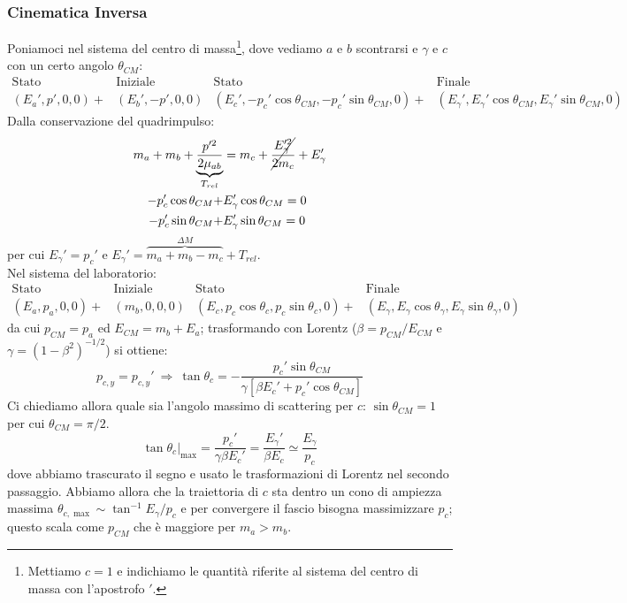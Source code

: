 \subsubsection{Cinematica Inversa} 
Poniamoci nel sistema del centro di massa\footnote{Mettiamo $c=1$ e indichiamo le quantità riferite al sistema del centro di massa con l'apostrofo $'$.}, dove vediamo $a$ e $b$ scontrarsi e $\gamma$ e $c$  con un certo angolo $\theta_{CM}$:
\begin{align*}
	\text{Stato  }&\text{Iniziale} & \text{Stato  }&\text{Finale} \\
	(E_a',p',0,0) +&(E_b',-p',0,0) & (E_c',-p_c'\cos{\theta_{CM}},-p_c'\sin{\theta_{CM},0}) +&(E_\gamma',E_\gamma'\cos{\theta_{CM}},E_\gamma'\sin{\theta_{CM}},0) 
\end{align*}
Dalla conservazione del quadrimpulso:
\begin{align*}
	m_a+m_b + \underbrace{\frac{p'^{2}}{2\mu_{ab}}}_{T_{rel}} &= m_c + \cancel{\frac{E_\gamma'^2}{2m_c}}+E_\gamma' \\ 
	-p_c'\cos{\theta_{CM}} +& E_\gamma' \cos{\theta_{CM}} = 0\\
	-p_c'\sin{\theta_{CM}} +& E_\gamma' \sin{\theta_{CM}} = 0
\end{align*}
per cui $E_\gamma' = p_c'$ e $E_\gamma' = \overbrace{m_a+m_b-m_c}^{\Delta M} + T_{rel}$.\\ 
Nel sistema del laboratorio:
\begin{align*}
	\text{Stato  }&\text{Iniziale} & \text{Stato  }&\text{Finale} \\
	(E_a,p_a,0,0) +&(m_b,0,0,0) & (E_c,p_c\cos{\theta_{c}},p_c\sin{\theta_{c},0}) +&(E_\gamma,E_\gamma\cos{\theta_{\gamma}},E_\gamma\sin{\theta_{\gamma}},0) 
\end{align*}
da cui $p_{CM} =p_a$ ed $E_{CM} = m_b + E_a$; trasformando con Lorentz ($\beta = p_{CM}/E_{CM}$ e $\gamma = (1-\beta^2)^{-1/2}$) si ottiene:
$$p_{c,y} = p_{c,y}' \:\Rightarrow\: \tan{\theta_c} = -\frac{p_c' \sin{\theta_{CM}}}{\gamma [\beta E_c' +p_c'\cos{\theta_{CM}}]}$$
Ci chiediamo allora quale sia l'angolo massimo di scattering per $c$: $\sin{\theta_{CM}}=1$ per cui $\theta_{CM} = \pi/2$.
$$\tan{\theta_c}|_{\max{}} = \frac{p_c'}{\gamma\beta E_c'} = \frac{E_\gamma'}{\beta E_c}\simeq \frac{E_\gamma}{p_c} $$
dove abbiamo trascurato il segno e usato le trasformazioni di Lorentz nel secondo passaggio. Abbiamo allora che la traiettoria di $c$ sta dentro un cono di ampiezza massima $\theta_{c,\max{}} \sim \tan^{-1}{E_\gamma/p_c}$ e per convergere il fascio bisogna massimizzare $p_c$; questo scala come $p_{CM}$ che è maggiore per $m_a>m_b$.\\
